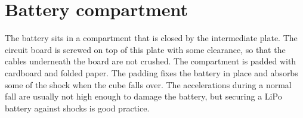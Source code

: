 \section{Battery compartment}

The battery sits in a compartment that is closed by the intermediate plate. The circuit board is
screwed on top of this plate with some clearance, so that the cables underneath the board are not
crushed. The compartment is padded with cardboard and folded paper. The padding
fixes the battery in place and absorbs some of the shock when the cube falls over. The
accelerations during a normal fall are usually not high enough to damage the battery, but
securing a LiPo battery against shocks is good practice.
